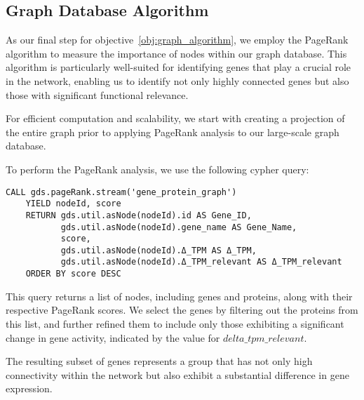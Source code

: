 \subsection{Graph Database Algorithm} \label{subsec:graph_database_algo}
As our final step for objective~\ref{obj:graph_algorithm},
we employ the PageRank algorithm to measure the importance of nodes within our graph database.
This algorithm is particularly well-suited for identifying genes that play a crucial role in the network,
enabling us to identify not only highly connected genes but also those with significant functional relevance.

For efficient computation and scalability,
we start with creating a projection of the entire graph prior to applying PageRank analysis to our large-scale graph database.

To perform the PageRank analysis, we use the following cypher query:
\begin{lstlisting}[language=Cypher, label={lst:pagerank}]
    CALL gds.pageRank.stream('gene_protein_graph')
    YIELD nodeId, score
    RETURN gds.util.asNode(nodeId).id AS Gene_ID,
           gds.util.asNode(nodeId).gene_name AS Gene_Name,
           score,
           gds.util.asNode(nodeId).Δ_TPM AS Δ_TPM,
           gds.util.asNode(nodeId).Δ_TPM_relevant AS Δ_TPM_relevant
    ORDER BY score DESC
\end{lstlisting}

This query returns a list of nodes, including genes and proteins, along with their respective PageRank scores.
We select the genes by filtering out the proteins from this list, and
further refined them to include only those exhibiting a significant change in gene activity,
indicated by the value for $delta\_tpm\_relevant$.

The resulting subset of genes represents a group that has not only high connectivity
within the network but also exhibit a substantial difference in gene expression.\\

